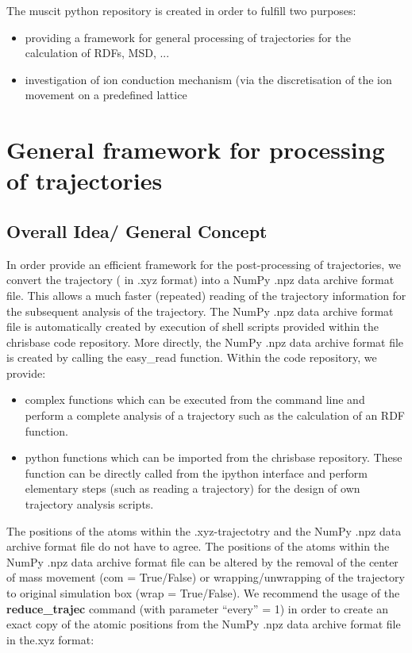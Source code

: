 \documentclass{article}
\begin{document}
The muscit python repository is created in order to fulfill two purposes:
 \begin{itemize}
  \item providing a framework for general processing of trajectories for the calculation of RDFs, MSD, ... 
  \item investigation of ion conduction mechanism (via the discretisation of the ion movement on a predefined lattice
 \end{itemize}

 
 


\section{General framework for processing of trajectories}

\subsection{Overall Idea/ General Concept}
In order provide an efficient framework for   the post-processing of trajectories, we convert the  trajectory ( in .xyz format) into a  NumPy .npz data archive format file.
%
%
This allows a much faster (repeated) reading of the trajectory information for the subsequent analysis of the trajectory.     
The NumPy .npz data archive format file is automatically created by execution of shell scripts provided within the chrisbase code repository. More directly, the NumPy .npz data archive format file is created by calling the easy\_read function.
Within the code repository, we provide:
 \begin{itemize}
  \item complex functions which can be executed from the command line and perform a complete analysis of a trajectory such as the calculation of an RDF function.  
  \item python functions which can be imported from the chrisbase repository. These function can be directly called from the ipython interface and perform elementary steps (such as reading a trajectory)  for the design of own trajectory analysis scripts.      
 \end{itemize}





The positions of the atoms within the .xyz-trajectotry and the  NumPy .npz data archive format file do not have to agree. The positions of the atoms within the NumPy .npz data archive format file can be altered by the removal of the center of mass movement (com = True/False) or wrapping/unwrapping of the trajectory to original simulation box (wrap = True/False). 
We recommend the usage of the \textbf{reduce\_trajec} command  (with parameter ``every'' = 1) in order to create an exact  copy of the atomic positions  from the  NumPy .npz data archive format file  in the.xyz format:
\end{document}
